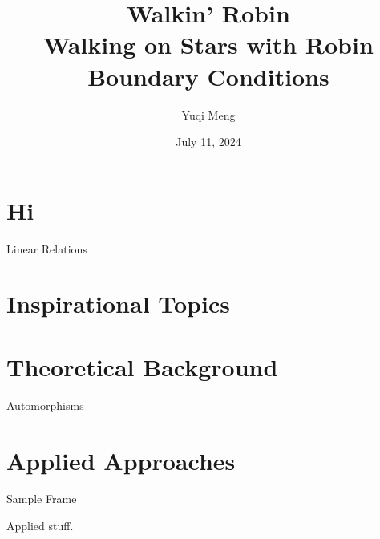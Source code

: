 \documentclass{beamer}
\title{Walkin' Robin \\[1pt] {\Large Walking on Stars with Robin Boundary Conditions}}
\author{Yuqi Meng}
\date{July 11, 2024}
\begin{document}
\maketitle


\section{Hi}

\begin{frame}{Linear Relations}

\end{frame}


\section{Inspirational Topics}

\begin{frame}
    
\end{frame}


\section{Theoretical Background}

\begin{frame}{Automorphisms}

\end{frame}


\section{Applied Approaches}

\begin{frame}{Sample Frame}

	Applied stuff.

\end{frame}


\thankframe
\end{document}
